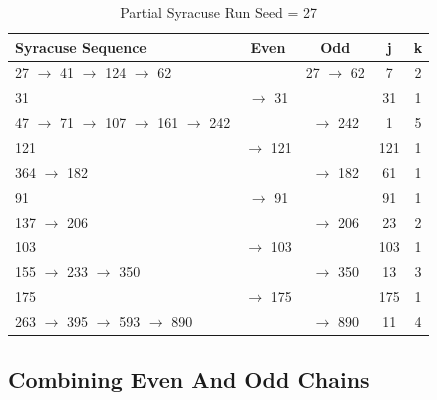 \documentclass[preprint]{sigplanconf}
\begin{document}
\begin{table} [ht]
    \begin{center}
        \begin{tabular}{|l|c|c|c|c|}
            \hline
            \textbf{Syracuse Sequence}                & \textbf{Even} & \textbf{Odd} & \textbf{j} & \textbf{k} \\
            \hline
            27 $\to$ 41 $\to$ 124 $\to$ 62            &               & 27 $\to$ 62  & 7          & 2          \\
            \hline
            31                                        & $\to$ 31      &              & 31         & 1          \\
            \hline
            47 $\to$ 71 $\to$ 107 $\to$ 161 $\to$ 242 &               & $\to$ 242    & 1          & 5          \\
            \hline
            121                                       & $\to$ 121     &              & 121        & 1          \\
            \hline
            364 $\to$ 182                             &               & $\to$ 182    & 61         & 1          \\
            \hline
            91                                        & $\to$ 91      &              & 91         & 1          \\
            \hline
            137 $\to$ 206                             &               & $\to$ 206    & 23         & 2          \\
            \hline
            103                                       & $\to$ 103     &              & 103        & 1          \\
            \hline
            155 $\to$ 233 $\to$ 350                   &               & $\to$ 350    & 13         & 3          \\
            \hline
            175                                       & $\to$ 175     &              & 175        & 1          \\
            \hline
            263 $\to$ 395 $\to$ 593 $\to$ 890         &               & $\to$ 890    & 11         & 4          \\
            \hline
        \end{tabular}
        \caption{Partial Syracuse Run Seed = 27}
        \label{table:partialSyracuseRun}
    \end{center}
\end{table}

\subsection{Combining Even And Odd Chains}
\end{document}
